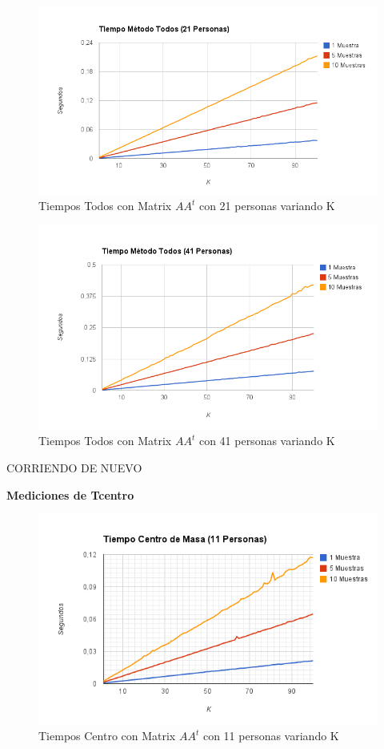 \begin{figure}[H]
\includegraphics[width=1\textwidth]{img/imagee.png}
     \caption{Tiempos Todos con Matrix $AA^t$ con 21 personas variando K}
\end{figure}

\begin{figure}[H]
\includegraphics[width=1\textwidth]{img/imagef.png}
     \caption{Tiempos Todos con Matrix $AA^t$ con 41 personas variando K}
\end{figure}

CORRIENDO DE NUEVO

\textbf{Mediciones de Tcentro }

\begin{figure}[H]
\includegraphics[width=1\textwidth]{img/imageg.png}
     \caption{Tiempos Centro con Matrix $AA^t$ con 11 personas variando K}
\end{figure}


